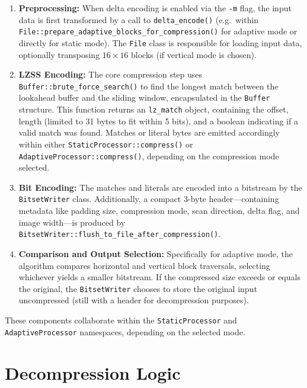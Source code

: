 \documentclass[a4paper,12pt]{article}
\begin{document}
    \begin{enumerate}
        \item \textbf{Preprocessing:} When delta encoding is enabled via the \texttt{-m} flag, the input data is
        first transformed by a call to
        \texttt{delta\_encode()} (e.g.\ within \\ \texttt{File::prepare\_adaptive\_blocks\_for\_compression()} for adaptive mode or directly for static mode). The \texttt{File} class is responsible for loading input data, optionally transposing $16\times16$ blocks (if vertical mode is chosen).

        \item \textbf{LZSS Encoding:} The core compression step uses \texttt{Buffer::brute\_force\_search()} to find the longest match between the lookahead buffer and the sliding window, encapsulated in the \texttt{Buffer} structure. This function returns an \texttt{lz\_match} object, containing the offset, length (limited to 31 bytes to fit within 5 bits), and a boolean indicating if a valid match was found. Matches or literal bytes are emitted accordingly within either \texttt{StaticProcessor::compress()} or \texttt{AdaptiveProcessor::compress()}, depending on the compression mode selected.

        \item \textbf{Bit Encoding:} The matches and literals are encoded into a bitstream by the \texttt{BitsetWriter} class. Additionally, a compact 3-byte header—containing metadata like padding size, compression mode, scan direction, delta flag, and image width—is produced by \texttt{BitsetWriter::flush\_to\_file\_after\_compression()}.

        \item \textbf{Comparison and Output Selection:} Specifically for adaptive mode, the algorithm compares
        horizontal and vertical block traversals, selecting whichever yields a smaller bitstream. If the compressed
        size exceeds or equals the original, the \texttt{BitsetWriter} chooses to store the original input
        uncompressed (still with a header for decompression purposes).
    \end{enumerate}

    These components collaborate within the \texttt{StaticProcessor} and \texttt{AdaptiveProcessor} namespaces, depending on the selected mode.


    \section{Decompression Logic}
\end{document}
